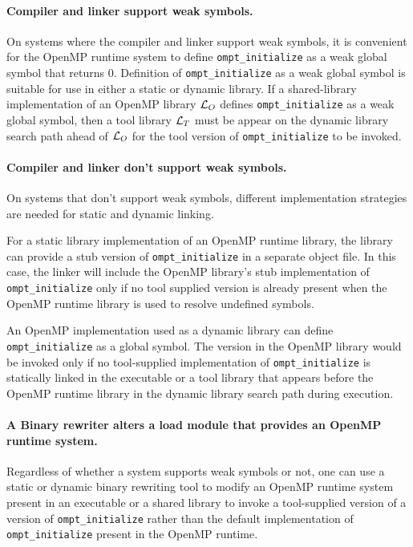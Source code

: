 \documentclass{article}
\begin{document}
\paragraph{Compiler and linker support weak symbols.}
On systems  where the compiler and linker support weak symbols, it is convenient for the 
OpenMP runtime system to define \verb|ompt_initialize| as a weak global symbol  that returns 0. Definition of \verb|ompt_initialize| as a weak global symbol is suitable for use in either a static or dynamic library. If a shared-library implementation of an OpenMP library ${\cal L}_O$ defines \verb|ompt_initialize| as a weak global symbol, then a tool library  ${\cal L}_T$ must be appear on the dynamic library search path ahead of ${\cal L}_O$ for the tool version of  \verb|ompt_initialize| to be invoked.

\paragraph{Compiler and linker don't support weak symbols.}

On systems that don't support weak symbols, different implementation strategies are needed for static and dynamic linking. 

For a static library implementation of an  OpenMP runtime library,  the library can provide a stub version of \verb|ompt_initialize|  in a separate object file. In this case, the linker will include the OpenMP library's stub implementation of  \verb|ompt_initialize| only if no tool supplied version is already present when the OpenMP runtime library is used to resolve undefined symbols.

An OpenMP implementation used as a dynamic library can define \verb|ompt_initialize| as a global symbol. The version in the OpenMP library would  be invoked only if no tool-supplied implementation of  \verb|ompt_initialize| is statically linked in the executable or  a tool library that appears before the OpenMP runtime library in the dynamic library search path during execution.

\paragraph{A Binary rewriter alters a load module that provides an OpenMP runtime system.}
Regardless of whether a system supports weak symbols or not, one can use a static or dynamic binary rewriting tool to modify an 
OpenMP runtime system present in an executable or a shared library to invoke a tool-supplied version of 
a version of \verb|ompt_initialize| rather than the default implementation of \verb|ompt_initialize| present in the OpenMP runtime.
\end{document}

